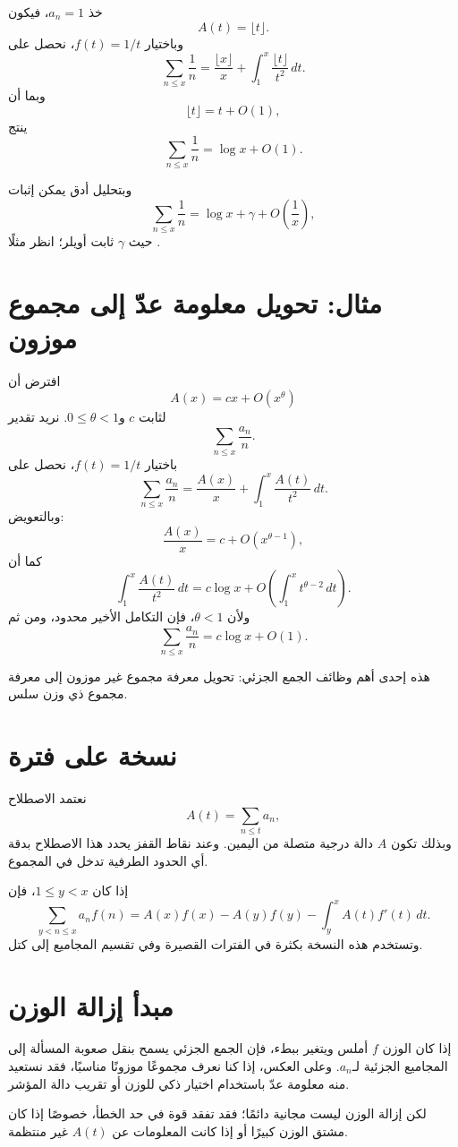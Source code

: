 خذ \(a_n=1\)، فيكون
\[
A(t)=\lfloor t\rfloor.
\]
وباختيار \(f(t)=1/t\)، نحصل على
\[
\sum_{n\leq x}\frac1n
=
\frac{\lfloor x\rfloor}{x}
+
\int_1^x\frac{\lfloor t\rfloor}{t^2}\,dt.
\]
وبما أن
\[
\lfloor t\rfloor=t+O(1),
\]
ينتج
\[
\sum_{n\leq x}\frac1n
=
\log x+O(1).
\]

وبتحليل أدق يمكن إثبات
\[
\sum_{n\leq x}\frac1n
=
\log x+\gamma+O\left(\frac1x\right),
\]
حيث \(\gamma\) ثابت أويلر؛ انظر مثلًا \cite{Apostol1976}.

\section{مثال: تحويل معلومة عدّ إلى مجموع موزون}

افترض أن
\[
A(x)=cx+O(x^\theta)
\]
لثابت \(c\) و\(0\leq\theta<1\). نريد تقدير
\[
\sum_{n\leq x}\frac{a_n}{n}.
\]
باختيار \(f(t)=1/t\)، نحصل على
\[
\sum_{n\leq x}\frac{a_n}{n}
=
\frac{A(x)}{x}
+
\int_1^x\frac{A(t)}{t^2}\,dt.
\]
وبالتعويض:
\[
\frac{A(x)}x=c+O(x^{\theta-1}),
\]
كما أن
\[
\int_1^x\frac{A(t)}{t^2}\,dt
=
c\log x
+
O\left(\int_1^x t^{\theta-2}\,dt\right).
\]
ولأن \(\theta<1\)، فإن التكامل الأخير محدود، ومن ثم
\[
\sum_{n\leq x}\frac{a_n}{n}
=
c\log x+O(1).
\]

هذه إحدى أهم وظائف الجمع الجزئي: تحويل معرفة مجموع غير موزون إلى معرفة مجموع ذي وزن سلس.

\section{نسخة على فترة}

نعتمد الاصطلاح
\[
A(t)=\sum_{n\leq t}a_n,
\]
وبذلك تكون \(A\) دالة درجية متصلة من اليمين. وعند نقاط القفز يحدد هذا
الاصطلاح بدقة أي الحدود الطرفية تدخل في المجموع.

إذا كان \(1\leq y<x\)، فإن
\[
\sum_{y<n\leq x}a_nf(n)
=
A(x)f(x)-A(y)f(y)
-
\int_y^x A(t)f'(t)\,dt.
\]
وتستخدم هذه النسخة بكثرة في الفترات القصيرة وفي تقسيم المجاميع إلى كتل.

\section{مبدأ إزالة الوزن}

إذا كان الوزن \(f\) أملس ويتغير ببطء، فإن الجمع الجزئي يسمح بنقل صعوبة المسألة إلى المجاميع الجزئية لـ\(a_n\). وعلى العكس، إذا كنا نعرف مجموعًا موزونًا مناسبًا، فقد نستعيد منه معلومة عدّ باستخدام اختيار ذكي للوزن أو تقريب دالة المؤشر.

لكن إزالة الوزن ليست مجانية دائمًا؛ فقد تفقد قوة في حد الخطأ، خصوصًا إذا كان مشتق الوزن كبيرًا أو إذا كانت المعلومات عن \(A(t)\) غير منتظمة.

